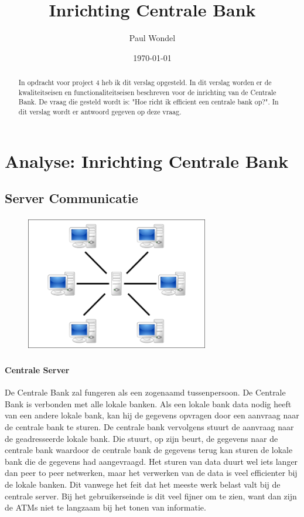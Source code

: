 \documentclass{article}
\begin{document}
\title{Inrichting Centrale Bank}
\author{Paul Wondel}
\date{\today}
\maketitle

\begin{abstract}
In opdracht voor project 4 heb ik dit verslag opgesteld.
In dit verslag worden er de kwaliteitseisen en functionaliteitseisen
beschreven voor de inrichting van de Centrale Bank.
De vraag die gesteld wordt is: "Hoe richt ik efficient een centrale bank op?".
In dit verslag wordt er antwoord gegeven op deze vraag.
\end{abstract}

\clearpage
\newpage

\tableofcontents

\clearpage
\newpage

\section{Analyse: Inrichting Centrale Bank}
\vspace{6mm}
\subsection{Server Communicatie}
\begin{figure}[h]
\includegraphics[height=6cm, width=8cm]{centralserver.png}
\centering
\end{figure}

\paragraph{Centrale Server}
De Centrale Bank zal fungeren als een zogenaamd tussenpersoon.
De Centrale Bank is verbonden met alle lokale banken.
Als een lokale bank data nodig heeft van een andere lokale bank,
kan hij de gegevens opvragen door een aanvraag naar de centrale bank te sturen.
De centrale bank vervolgens stuurt de aanvraag naar de geadresseerde lokale bank.
Die stuurt, op zijn beurt, de gegevens naar de centrale bank waardoor de centrale bank
de gegevens terug kan sturen de lokale bank die de gegevens had aangevraagd.
Het sturen van data duurt wel iets langer dan peer to peer netwerken,
maar het verwerken van de data is veel efficienter bij de lokale banken.
Dit vanwege het feit dat het meeste werk belast valt bij de centrale server.
Bij het gebruikerseinde is dit veel fijner om te zien,
want dan zijn de ATMs niet te langzaam bij het tonen van informatie.
\end{document}
